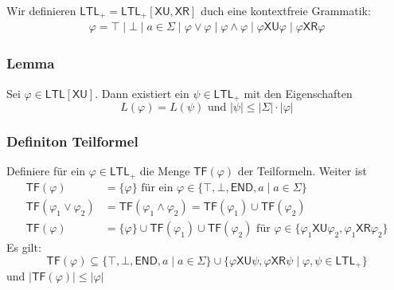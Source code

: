 \documentclass[12pt, german]{article}
\newcommand{\ltl}{\mathsf{LTL}}
\newcommand{\sX}{\mathsf{X}}
\newcommand{\sU}{\mathsf{U}}
\newcommand{\sR}{\mathsf{R}}
\newcommand{\sende}{\mathsf{END}}
\newcommand{\tf}{\mathsf{TF}}
\begin{document}
		Wir definieren $\ltl_+ = \ltl_+[\sX \sU, \sX\sR]$ duch eine kontextfreie Grammatik: 
			\begin{align*}
				\varphi = \top \mid \bot \mid a \in \Sigma \mid \varphi \lor \varphi \mid \varphi \land \varphi \mid \varphi \sX \sU \varphi \mid \varphi \sX\sR\varphi
			\end{align*}
\subsubsection{Lemma}
	Sei $\varphi \in \ltl[\sX\sU]$. Dann existiert ein $\psi \in \ltl_+$ mit den Eigenschaften $$L(\varphi) = L(\psi) \text{ und }|\psi| \leq |\Sigma| \cdot |\varphi|$$

\subsubsection{Definiton Teilformel}
	Definiere für ein $\varphi \in \ltl_+$ die Menge  $\tf(\varphi)$ der Teilformeln. Weiter ist
	\begin{align*}
		\tf(\varphi) &= \{\varphi\} \text{ für ein } \varphi \in \{\top, \bot, \sende, a \mid a \in \Sigma\} \\
		\tf(\varphi_1 \lor \varphi_2) &= \tf(\varphi_1 \land \varphi_2) = \tf(\varphi_1) \cup \tf(\varphi_2)\\
		 \tf(\varphi) &=\{\varphi\} \cup \tf(\varphi_1) \cup \tf(\varphi_2) \text{ für } \varphi \in \{\varphi_1 \sX\sU\varphi_2,  \varphi_1\sX\sR\varphi_2\}
	\end{align*}
	Es gilt: $$\tf(\varphi) \subseteq \{\top, \bot, \sende, a \mid a \in \Sigma\} \cup \{\varphi \sX\sU\psi, \varphi\sX\sR\psi \mid \varphi, \psi \in \ltl_+\}$$ und $|\tf(\varphi)| \leq |\varphi|$
\end{document}
